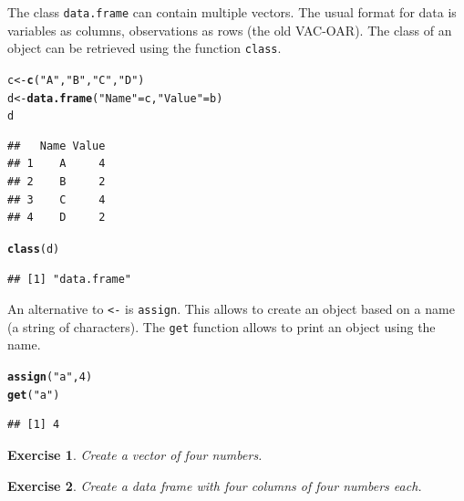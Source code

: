 \documentclass{article}\usepackage[]{graphicx}\usepackage[]{color}
\makeatletter
\newcommand{\hlnum}[1]{\textcolor[rgb]{0.686,0.059,0.569}{#1}}%
\newcommand{\hlstr}[1]{\textcolor[rgb]{0.192,0.494,0.8}{#1}}%
\newcommand{\hlstd}[1]{\textcolor[rgb]{0.345,0.345,0.345}{#1}}%
\newcommand{\hlkwb}[1]{\textcolor[rgb]{0.69,0.353,0.396}{#1}}%
\newcommand{\hlkwd}[1]{\textcolor[rgb]{0.737,0.353,0.396}{\textbf{#1}}}%
\newenvironment{kframe}{%
 \def\at@end@of@kframe{}%
 \ifinner\ifhmode%
  \def\at@end@of@kframe{\end{minipage}}%
  \begin{minipage}{\columnwidth}%
 \fi\fi%
 \def\FrameCommand##1{\hskip\@totalleftmargin \hskip-\fboxsep
 \colorbox{shadecolor}{##1}\hskip-\fboxsep
     \hskip-\linewidth \hskip-\@totalleftmargin \hskip\columnwidth}%
 \MakeFramed {\advance\hsize-\width
   \@totalleftmargin\z@ \linewidth\hsize
   \@setminipage}}%
 {\par\unskip\endMakeFramed%
 \at@end@of@kframe}
\newenvironment{knitrout}{}{} %
\newtheorem{exercise}{Exercise}[section]
\makeatother
\begin{document}
The class \texttt{data.frame} can contain multiple vectors. The usual format for data is variables as columns, observations as rows (the old VAC-OAR). The class of an object can be retrieved using the function \texttt{class}.
\begin{knitrout}
\color{fgcolor}\begin{kframe}
\begin{alltt}
\hlstd{c} \hlkwb{<-} \hlkwd{c}\hlstd{(}\hlstr{"A"}\hlstd{,} \hlstr{"B"}\hlstd{,} \hlstr{"C"}\hlstd{,} \hlstr{"D"}\hlstd{)}
\hlstd{d} \hlkwb{<-} \hlkwd{data.frame}\hlstd{(}\hlstr{"Name"} \hlstd{= c,} \hlstr{"Value"} \hlstd{= b)}
\hlstd{d}
\end{alltt}
\begin{verbatim}
##   Name Value
## 1    A     4
## 2    B     2
## 3    C     4
## 4    D     2
\end{verbatim}
\begin{alltt}
\hlkwd{class}\hlstd{(d)}
\end{alltt}
\begin{verbatim}
## [1] "data.frame"
\end{verbatim}
\end{kframe}
\end{knitrout}

An alternative to \texttt{<-} is \texttt{assign}. This allows to create an object based on a name (a string of characters). The \texttt{get} function allows to print an object using the name.
\begin{knitrout}
\color{fgcolor}\begin{kframe}
\begin{alltt}
\hlkwd{assign}\hlstd{(}\hlstr{"a"}\hlstd{,} \hlnum{4}\hlstd{)}
\hlkwd{get}\hlstd{(}\hlstr{"a"}\hlstd{)}
\end{alltt}
\begin{verbatim}
## [1] 4
\end{verbatim}
\end{kframe}
\end{knitrout}

\begin{exercise}
Create a vector of four numbers.
\end{exercise}

\begin{exercise} \label{exDf}
Create a data frame with four columns of four numbers each.
\end{exercise}
\end{document}

